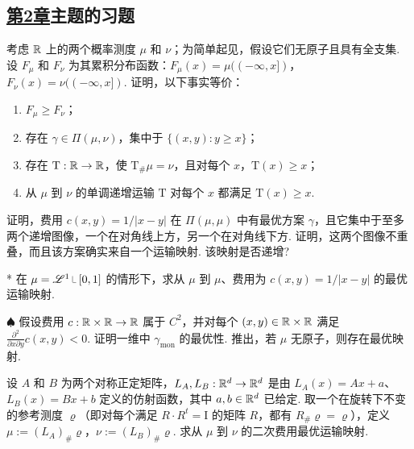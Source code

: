 \subsection*{\hyperref[sec:2]{第2章}主题的习题}
\begin{exercise}\label{ex:7}
考虑 $\mathbb R$ 上的两个概率测度 $\mu$ 和 $\nu$；为简单起见，假设它们无原子且具有全支集. 设 $F_\mu$ 和 $F_\nu$ 为其累积分布函数：$F_\mu(x)=\mu((-\infty,x])$，$F_\nu(x)=\nu((-\infty,x])$. 证明，以下事实等价：
\begin{enumerate}
\item $F_\mu\geq F_\nu$；
\item 存在 $\gamma\in\Pi(\mu,\nu)$，集中于 $\{(x,y):y\geq x\}$；
\item 存在 $\mathrm T:\mathbb R\to\mathbb R$，使 $\mathrm T_\#\mu=\nu$，且对每个 $x$，$\mathrm T(x)\geq x$；
\item 从 $\mu$ 到 $\nu$ 的单调递增运输 $\mathrm T$ 对每个 $x$ 都满足 $\mathrm T(x)\geq x$.
\end{enumerate}
\end{exercise}

\begin{exercise}\label{ex:8}
证明，费用 $c(x,y)=1/|x-y|$ 在 $\Pi(\mu,\mu)$ 中有最优方案 $\gamma$，且它集中于至多两个递增图像，一个在对角线上方，另一个在对角线下方. 证明，这两个图像不重叠，而且该方案确实来自一个运输映射. 该映射是否递增?
\end{exercise}

\begin{exercise}\label{ex:9}
* 在 $\mu=\mathscr L^1\restr[0,1]$ 的情形下，求从 $\mu$ 到 $\mu$、费用为 $c(x,y)=1/|x-y|$ 的最优运输映射.
\end{exercise}

\begin{exercise}\label{ex:10}
$\spadesuit$ 假设费用 $c:\mathbb R\times\mathbb R\to\mathbb R$ 属于 $C^2$，并对每个 $(x,y)\in\mathbb R\times\mathbb R$ 满足 $\frac{\partial^2}{\partial x\partial y}c(x,y)<0$. 证明一维中 $\gamma_{\mathrm{mon}}$ 的最优性. 推出，若 $\mu$ 无原子，则存在最优映射.
\end{exercise}

\begin{exercise}\label{ex:11}
设 $A$ 和 $B$ 为两个对称正定矩阵，$L_A,L_B:\mathbb R^d\to\mathbb R^d$ 是由 $L_A(x)=Ax+a$、$L_B(x)=Bx+b$ 定义的仿射函数，其中 $a,b\in\mathbb R^d$ 已给定. 取一个在旋转下不变的参考测度 $\varrho$（即对每个满足 $R\cdot R^t=\mathrm I$ 的矩阵 $R$，都有 $R_\#\varrho=\varrho$），定义 $\mu:=(L_A)_\#\varrho$，$\nu:=(L_B)_\#\varrho$. 求从 $\mu$ 到 $\nu$ 的二次费用最优运输映射.
\end{exercise}

